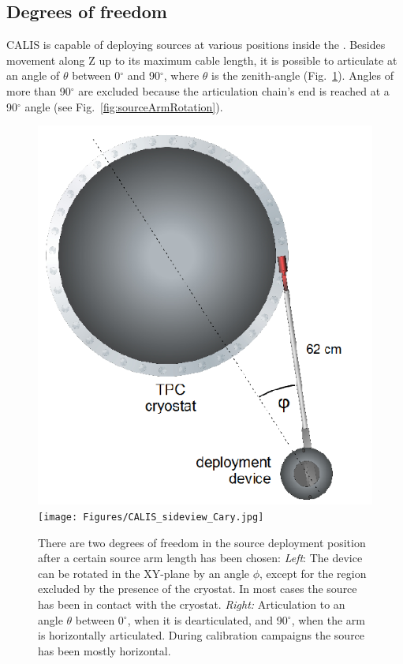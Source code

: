 \subsection{Degrees of freedom}

CALIS is capable of deploying sources at various positions inside the \lsv. Besides movement along Z up to its maximum cable length, it is possible to articulate at an angle of $\theta$ between 0$^{\circ}$ and 90$^{\circ}$, where $\theta$ is the zenith-angle (Fig.~\ref{fig:coordinate_system}). Angles of more than 90$^{\circ}$ are excluded because the articulation chain's end is reached at a 90$^{\circ}$ angle (see Fig.~\ref{fig:sourceArmRotation}).

\begin{figure}[htbp]
 \centering
  \includegraphics[height=0.35\textheight,clip=true]{Figures/DeploymentDevice_XY_view}
  \texttt{[image: Figures/CALIS\_sideview\_Cary.jpg]}
  \caption{There are two degrees of freedom in the source deployment position after a certain source arm length has been chosen: \textit{Left}: The device can be rotated in the XY-plane by an angle $\phi$, except for the region excluded by the presence of the cryostat. In most cases the source has been in contact with the cryostat. 
\textit{Right:} Articulation to an angle $\theta$ between 0$^{\circ}$, when it is dearticulated, and 90$^{\circ}$, when the arm is horizontally articulated. During calibration campaigns the source has been mostly horizontal.
  \label{fig:coordinate_system}}
\end{figure} 


